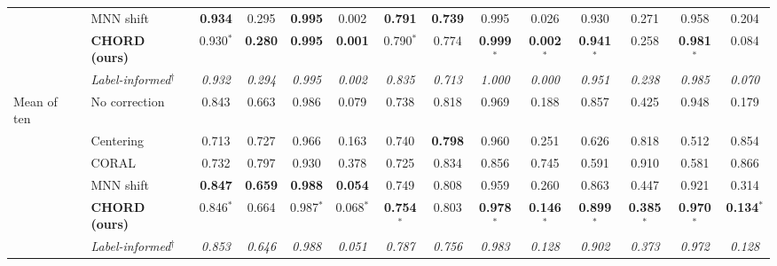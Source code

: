 \begin{tabular}{llcccccccccccc}
 & MNN shift & \textbf{0.934} & 0.295 & \textbf{0.995} & 0.002 & \textbf{0.791} & \textbf{0.739} & 0.995 & 0.026 & 0.930 & 0.271 & 0.958 & 0.204 \\
 & \textbf{CHORD (ours)} & 0.930$^{*}$ & \textbf{0.280} & \textbf{0.995} & \textbf{0.001} & 0.790$^{*}$ & 0.774 & \textbf{0.999$^{*}$} & \textbf{0.002$^{*}$} & \textbf{0.941$^{*}$} & 0.258 & \textbf{0.981$^{*}$} & 0.084 \\
 & \textit{Label-informed$^\dagger$} & \textit{0.932} & \textit{0.294} & \textit{0.995} & \textit{0.002} & \textit{0.835} & \textit{0.713} & \textit{1.000} & \textit{0.000} & \textit{0.951} & \textit{0.238} & \textit{0.985} & \textit{0.070} \\
\midrule
Mean of ten & No correction & 0.843 & 0.663 & 0.986 & 0.079 & 0.738 & 0.818 & 0.969 & 0.188 & 0.857 & 0.425 & 0.948 & 0.179 \\
 & Centering & 0.713 & 0.727 & 0.966 & 0.163 & 0.740 & \textbf{0.798} & 0.960 & 0.251 & 0.626 & 0.818 & 0.512 & 0.854 \\
 & CORAL & 0.732 & 0.797 & 0.930 & 0.378 & 0.725 & 0.834 & 0.856 & 0.745 & 0.591 & 0.910 & 0.581 & 0.866 \\
 & MNN shift & \textbf{0.847} & \textbf{0.659} & \textbf{0.988} & \textbf{0.054} & 0.749 & 0.808 & 0.959 & 0.260 & 0.863 & 0.447 & 0.921 & 0.314 \\
 & \textbf{CHORD (ours)} & 0.846$^{*}$ & 0.664 & 0.987$^{*}$ & 0.068$^{*}$ & \textbf{0.754$^{*}$} & 0.803 & \textbf{0.978$^{*}$} & \textbf{0.146$^{*}$} & \textbf{0.899$^{*}$} & \textbf{0.385$^{*}$} & \textbf{0.970$^{*}$} & \textbf{0.134$^{*}$} \\
 & \textit{Label-informed$^\dagger$} & \textit{0.853} & \textit{0.646} & \textit{0.988} & \textit{0.051} & \textit{0.787} & \textit{0.756} & \textit{0.983} & \textit{0.128} & \textit{0.902} & \textit{0.373} & \textit{0.972} & \textit{0.128} \\
\bottomrule
\end{tabular}
